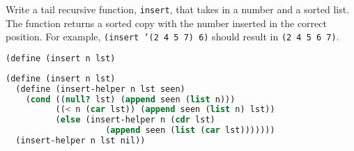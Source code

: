 \question
Write a tail recursive function, \texttt{insert}, that takes in a number and a
sorted list. The function returns a sorted copy with the number inserted in the
correct position. For example, \texttt{(insert '(2 4 5 7) 6)} should result in
\texttt{(2 4 5 6 7)}.
\begin{lstlisting}[language=Scheme]
(define (insert n lst)
\end{lstlisting}
\begin{solution}[1in]
\begin{lstlisting}[language=Scheme]
(define (insert n lst)
  (define (insert-helper n lst seen)
    (cond ((null? lst) (append seen (list n)))
          ((< n (car lst)) (append seen (list n) lst))
          (else (insert-helper n (cdr lst)
                    (append seen (list (car lst)))))))
  (insert-helper n lst nil))
\end{lstlisting}
\end{solution}
